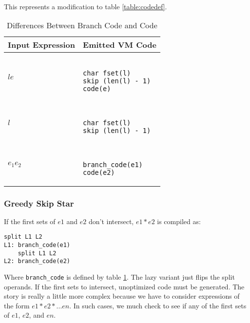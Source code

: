 \begin{table}
\caption{Differences Between Branch Code and Code}
This represents a modification to table \ref{table:codedef}.
\label{table:branchcode}
\centering
\begin{tabular}{| l | l |} \hline
Input Expression & Emitted VM Code \\ \hline
$l e$ &
  \begin{minipage}{4cm}
  \begin{verbatim}

char fset(l)
skip (len(l) - 1)
code(e)
  \end{verbatim}
  \end{minipage}
  \\ \hline
$l$ &
  \begin{minipage}{4cm}
  \begin{verbatim}

char fset(l)
skip (len(l) - 1)
  \end{verbatim}
  \end{minipage}
  \\ \hline
$e_1 e_2$ &
  \begin{minipage}{4cm}
  \begin{verbatim}

branch_code(e1)
code(e2)
  \end{verbatim}
  \end{minipage}
  \\ \hline
\end{tabular}
\end{table}
 
\subsubsection{Greedy Skip Star}

If the first sets of $e1$ and $e2$ don't intersect, $e1*e2$
is compiled as:

\begin{verbatim}
split L1 L2
L1: branch_code(e1)
    split L1 L2
L2: branch_code(e2)
\end{verbatim}

Where \verb'branch_code' is defined by table \ref{table:branchcode}.
The lazy variant just flips the split operands. If the first
sets to intersect, unoptimized code must be generated. The story
is really a little more complex because we have to consider
expressions of the form $e1*e2*...en$. In such cases, we much
check to see if any of the first sets of $e1$, $e2$, and $en$.

